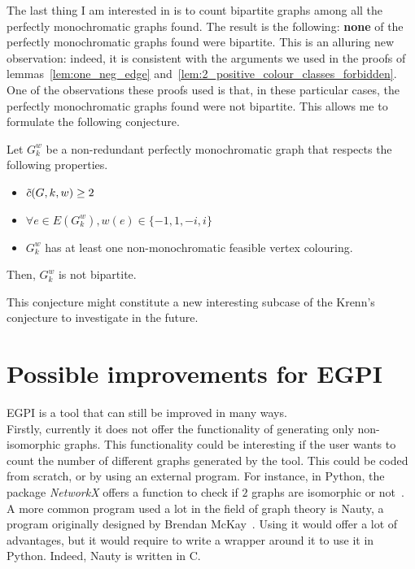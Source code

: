 The last thing I am interested in is to count bipartite graphs among all the perfectly monochromatic graphs found.
The result is the following: \textbf{none} of the perfectly monochromatic graphs found were bipartite.
This is an alluring new observation: indeed, it is consistent with the arguments we used in the proofs of lemmas~\ref{lem:one_neg_edge} and~\ref{lem:2_positive_colour_classes_forbidden}.
One of the observations these proofs used is that, in these particular cases, the perfectly monochromatic graphs found were not bipartite.
This allows me to formulate the following conjecture.

\begin{conjecture}
    \label{con:bipartite_perfectly_monochromatic}
    Let $G_k^w$ be a non-redundant perfectly monochromatic graph that respects the following properties.
    \begin{itemize}
        \item $\Tilde{c}(G, k, w) \geq 2$
        \item $\forall e \in E(G_k^w), w(e) \in \{-1, 1, -i, i\}$
        \item $G_k^w$ has at least one non-monochromatic feasible vertex colouring.
    \end{itemize}
    Then, $G_k^w$ is not bipartite.
\end{conjecture}

This conjecture might constitute a new interesting subcase of the Krenn's conjecture to investigate in the future.


\section{Possible improvements for EGPI}
\label{sec:possible-improvements-for-egpi}

EGPI is a tool that can still be improved in many ways.\\

Firstly, currently it does not offer the functionality of generating only non-isomorphic graphs.
This functionality could be interesting if the user wants to count the number of different graphs generated by the tool.
This could be coded from scratch, or by using an external program.
For instance, in Python, the package \textit{NetworkX} offers a function to check if $2$ graphs are isomorphic or not~\cite{networkx}.
A more common program used a lot in the field of graph theory is Nauty, a program originally designed by Brendan McKay~\cite{MCKAY201494}.
Using it would offer a lot of advantages, but it would require to write a wrapper around it to use it in Python.
Indeed, Nauty is written in C. \\

